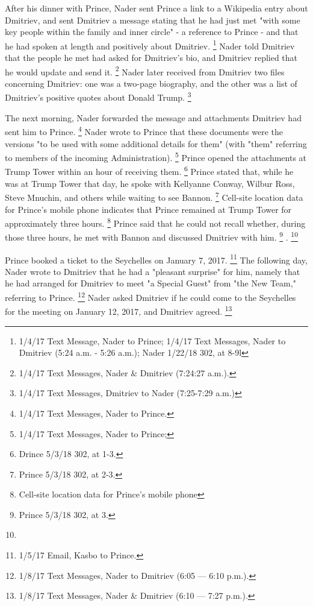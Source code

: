 After his dinner with Prince, Nader sent Prince a link to a Wikipedia entry about Dmitriev, and sent Dmitriev a message stating that he had just met "with some key people within the family and inner circle" - a reference to Prince - and that he had spoken at length and positively about Dmitriev.%
\footnote{1/4/17 Text Message, Nader to Prince;
1/4/17 Text Messages, Nader to Dmitriev (5:24 a.m. - 5:26 a.m.);
Nader 1/22/18 302, at 8-9l
}
Nader told Dmitriev that the people he met had asked for Dmitriev's bio, and Dmitriev replied that he would update and send it.%
\footnote{1/4/17 Text Messages, Nader \& Dmitriev (7:24:27 a.m.).}
Nader later received from Dmitriev two files concerning Dmitriev: one was a two-page biography, and the other was a list of Dmitriev's positive quotes about Donald Trump.%
\footnote{1/4/17 Text Messages, Dmitriev to Nader (7:25-7:29 a.m.)}

The next morning, Nader forwarded the message and attachments Dmitriev had sent him to Prince.%
\footnote{1/4/17 Text Messages, Nader to Prince.}
Nader wrote to Prince that these documents were the versions "to be used with some additional details for them" (with "them" referring to members of the incoming Administration).%
\footnote{1/4/17 Text Messages, Nader to Prince; }
Prince opened the attachments at Trump Tower within an hour of receiving them.%
\footnote{Drince 5/3/18 302, at 1-3.}
Prince stated that, while he was at Trump Tower that day, he spoke with Kellyanne Conway, Wilbur Ross, Steve Mnuchin, and others while waiting to see Bannon.%
\footnote{Prince 5/3/18 302, at 2-3.}
Cell-site location data for Prince's mobile phone indicates that Prince remained at Trump Tower for approximately three hours.%
\footnote{Cell-site location data for Prince's mobile phone }
Prince said that he could not recall whether, during those three hours, he met with Bannon and discussed Dmitriev with him.%
\footnote{Prince 5/3/18 302, at 3.}
.%
\footnote{}

Prince booked a ticket to the Seychelles on January 7, 2017.%
\footnote{1/5/17 Email, Kasbo to Prince.}
The following day, Nader wrote to Dmitriev that he had a "pleasant surprise" for him, namely that he had arranged for Dmitriev to meet "a Special Guest" from "the New Team," referring to Prince.%
\footnote{1/8/17 Text Messages, Nader to Dmitriev (6:05 — 6:10 p.m.).}
Nader asked Dmitriev if he could come to the Seychelles for the meeting on January 12, 2017, and Dmitriev agreed.%
\footnote{1/8/17 Text Messages, Nader \& Dmitriev (6:10 — 7:27 p.m.).}

